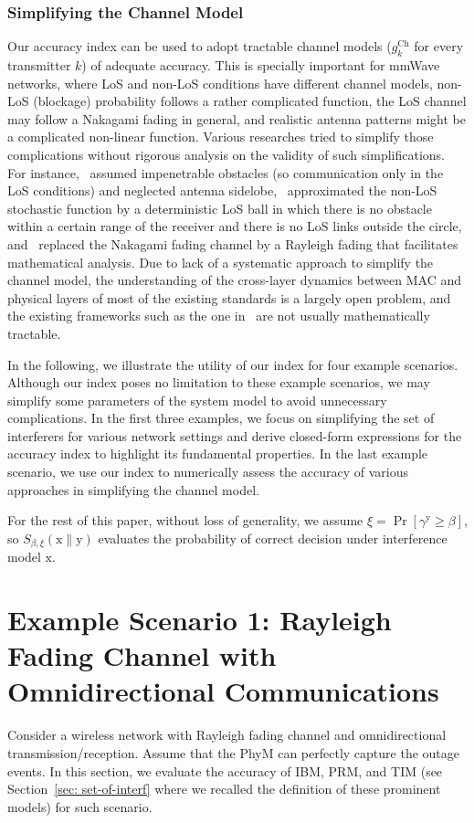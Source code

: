 \documentclass[12pt, draftclsnofoot, onecolumn]{IEEEtran}
\begin{document}
\subsubsection{Simplifying the Channel Model}
Our accuracy index can be used to adopt tractable channel models ($g_{k}^{\mathrm{Ch}}$ for every transmitter $k$) of adequate accuracy. This is specially important for mmWave networks, where LoS and non-LoS conditions have different channel models, non-LoS (blockage) probability follows a rather complicated function, the LoS channel may follow a Nakagami fading in general, and realistic antenna patterns might be a complicated non-linear function. Various researches tried to simplify those complications without rigorous analysis on the validity of such simplifications. For instance,~\cite{Singh2011Interference} assumed impenetrable obstacles (so communication only in the LoS conditions) and neglected antenna sidelobe,~\cite{di2014stochastic} approximated the non-LoS stochastic function by a deterministic LoS ball in which there is no obstacle within a certain range of the receiver and there is no LoS links outside the circle, and~\cite{Gupta2016Sharing} replaced the Nakagami fading channel by a Rayleigh fading that facilitates mathematical analysis. Due to lack of a systematic approach to simplify the channel model, the understanding of the cross-layer dynamics between MAC and physical layers of most of the existing standards is a largely open problem, and the existing frameworks such as the one in~\cite{PG2014modeling} are not usually mathematically tractable.

In the following, we illustrate the utility of our index for four example scenarios. Although our index poses no limitation to these example scenarios, we may simplify some parameters of the system model to avoid unnecessary complications.
In the first three examples, we focus on simplifying the set of interferers for various network settings and derive closed-form expressions for the accuracy index to highlight its fundamental properties. In the last example scenario, we use our index to numerically assess the accuracy of various approaches in simplifying the channel model.

For the rest of this paper, without loss of generality, we assume $\xi = \Pr \left[ \gamma^{\mathrm{y}} \geq \beta \right]$, so $S_{\beta,\xi}\left(\mathrm{x}\|\mathrm{y} \right)$ evaluates the probability of correct decision under interference model $\mathrm{x}$.

\section{Example Scenario 1: Rayleigh Fading Channel with Omnidirectional Communications}\label{sec: Rayleigh-noBlockage}
Consider a wireless network with Rayleigh fading channel and omnidirectional transmission/reception. Assume that the PhyM can perfectly capture the outage events. In this section, we evaluate the accuracy of IBM, PRM, and TIM (see Section~\ref{sec: set-of-interf} where we recalled the definition of these prominent models) for such scenario.
\end{document}
